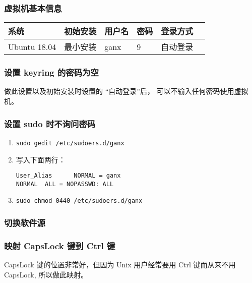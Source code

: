 \documentclass[
    11pt,
    cite=authoryear,
    device=normal,
    lang=cn,
    mode=simple,
    result=answer,
    toc=onecol,
]{elegantbook_sierxue}
\begin{document}
\subsubsection{虚拟机基本信息}%
\label{ssub:linux-ubuntu}

\begin{table}[H]
   \centering
     \begin{tabular}{llllll}
     \toprule
     系统 & 初始安装 & 用户名 & 密码 & 登录方式 \\
     \midrule
     Ubuntu 18.04 & 最小安装 & ganx   & 9 & 自动登录\\
     \bottomrule
     \end{tabular}%
   \label{tab:theorem-class}%
\end{table}%

\subsubsection{设置 keyring 的密码为空}%
\label{ssub:vm-keyring}

做此设置以及初始安装时设置的 ``自动登录''后，
可以不输入任何密码使用虚拟机。

\subsubsection{设置 sudo 时不询问密码}%
\label{ssub:vm-sudo}
\begin{enumerate}
    \item \lstinline{sudo gedit /etc/sudoers.d/ganx}
    \item 写入下面两行：
\begin{lstlisting}[escapeinside=``]
User_Alias      NORMAL = ganx
NORMAL  ALL = NOPASSWD: ALL
\end{lstlisting}
    \item \lstinline{sudo chmod 0440 /etc/sudoers.d/ganx}
\end{enumerate}

\subsubsection{切换软件源}%
\label{ssub:vm-source}

\subsubsection{映射 CapsLock 键到 Ctrl 键}%
\label{ssub:vm-caps-ctrl}

CapsLock 键的位置非常好，但因为 Unix 用户经常要用 Ctrl 键而从来不用 CapsLock,
所以做此映射。
\end{document}
